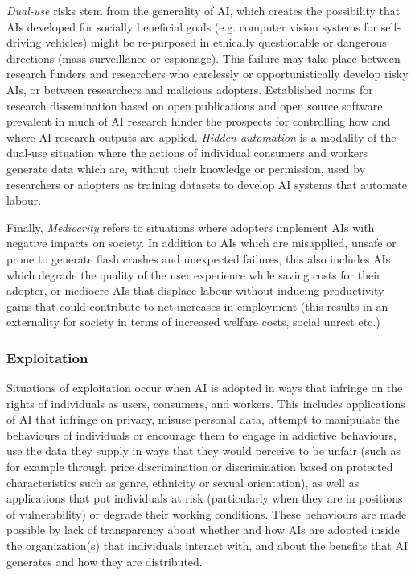 \documentclass[11pt]{article}
\begin{document}
\textit{Dual-use} risks stem from the generality of AI, which creates the possibility that AIs developed for socially beneficial goals (e.g. computer vision systems for self-driving vehicles) might be re-purposed in ethically questionable or dangerous directions (mass surveillance or espionage). This failure may take place between research funders and researchers who carelessly or opportunistically develop risky AIs, or between researchers and malicious adopters. Established norms for research dissemination based on open publications and open source software prevalent in much of AI research hinder the prospects for controlling how and where AI research outputs are applied.  \textit{Hidden automation} is a modality of the dual-use situation where the actions of individual consumers and workers generate data which are, without their knowledge or permission, used by researchers or adopters as training datasets to develop AI systems that automate labour. 

Finally, \textit{Mediocrity} refers to situations where adopters implement AIs with negative impacts on society. In addition to AIs which are misapplied, unsafe or prone to generate flash crashes and unexpected failures, this also includes AIs which degrade the quality of the user experience while saving costs for their adopter, or mediocre AIs that displace labour without inducing productivity gains that could contribute to net increases in employment (this results in an externality for society in terms of increased welfare costs, social unrest etc.)

\subsubsection*{Exploitation}
Situations of exploitation occur when AI is adopted in ways that infringe on the rights of individuals as users, consumers, and workers. This includes applications of AI that infringe on privacy, misuse personal data, attempt to manipulate the behaviours of individuals or encourage them to engage in addictive behaviours, use the data they supply in ways that they would perceive to be unfair (such as for example through price discrimination or discrimination based on protected characteristics such as genre, ethnicity or sexual orientation), as well as applications that put individuals at risk (particularly when they are in positions of vulnerability) or degrade their working conditions. These behaviours are made possible by lack of transparency about whether and how AIs are adopted inside the organization(s) that individuals interact with, and about the benefits that AI generates and how they are distributed.
\end{document}

